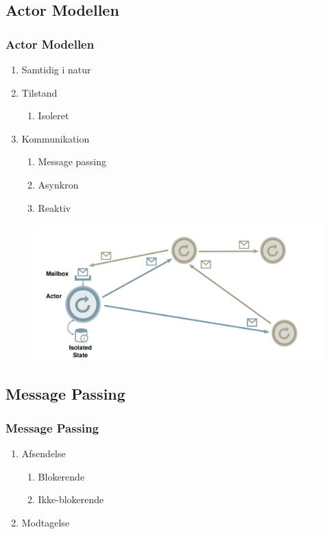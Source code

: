 \subsection{Actor Modellen}
\begin{frame}
  \frametitle{Actor Modellen}
  \begin{enumerate}
    \item Samtidig i natur
    \item Tilstand
    \begin{enumerate}
      \item Isoleret
    \end{enumerate}
    \item Kommunikation
    \begin{enumerate}
      \item Message passing
      \item Asynkron
      \item Reaktiv
    \end{enumerate}
  \end{enumerate}
  \begin{figure}[htbp]
  \centering
  \includegraphics[width=\textwidth]{Images/actors.pdf}
\end{figure}
\end{frame}

\subsection{Message Passing}
\begin{frame}
  \frametitle{Message Passing}
  \begin{enumerate}
    \item Afsendelse
    \begin{enumerate}
      \item Blokerende
      \item Ikke-blokerende
    \end{enumerate}
    \item Modtagelse
  \end{enumerate}
\end{frame}
